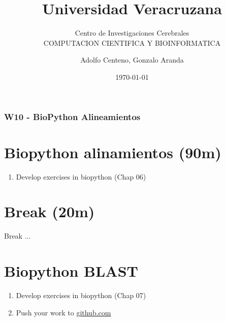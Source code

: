\documentclass{beamer}
\begin{document}
\title{Universidad Veracruzana}  
\subtitle{Centro de Investigaciones Cerebrales\\COMPUTACION CIENTIFICA Y BIOINFORMATICA}
\author{Adolfo Centeno, Gonzalo Aranda}
\date{\today} 

\begin{frame}
\titlepage
\end{frame}

\begin{frame}\frametitle{W10 - BioPython Alineamientos }
\tableofcontents
\end{frame} 


\section{Biopython alinamientos (90m) }

\begin{frame}


\begin{enumerate}

 
	
\item
  Develop exercises in biopython (Chap 06)
	
\end{enumerate} 


\end{frame}


\section{Break  (20m) }

\begin{frame}


Break ...

\end{frame}


\section{Biopython BLAST }

\begin{frame}

\begin{enumerate}

\item 
  Develop exercises in biopython (Chap 07)
\item
	Push your work to \href{https://github.com}{github.com}

\end{enumerate} 


\end{frame}
\end{document}
